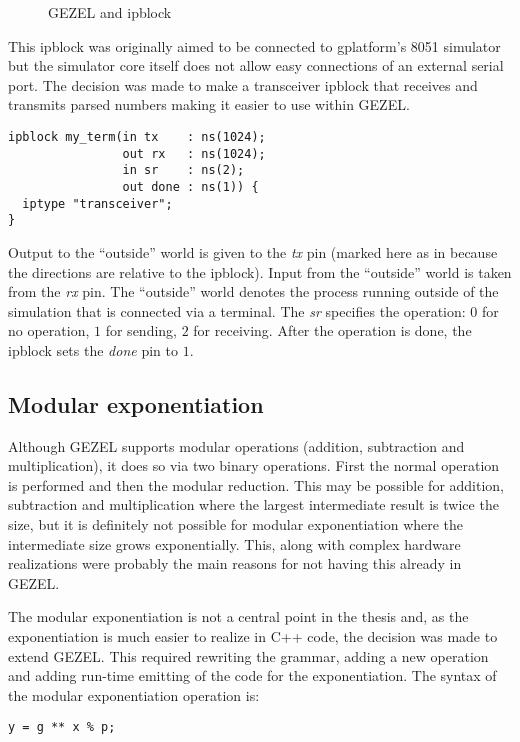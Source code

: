 \begin{figure}[hb!]
  \centering
  \caption{GEZEL and ipblock}
  \label{fig:gezel_ipblock}
\end{figure}

This ipblock was originally aimed to be connected to gplatform's 8051
simulator but the simulator core itself does not allow easy
connections of an external serial port. The decision was made to make
a transceiver ipblock that receives and transmits parsed numbers
making it easier to use within GEZEL.

\begin{lstlisting}[language=GEZEL]
ipblock my_term(in tx    : ns(1024);
                out rx   : ns(1024);
                in sr    : ns(2);
                out done : ns(1)) {
  iptype "transceiver";
}
\end{lstlisting}

Output to the ``outside'' world is given to the \emph{tx} pin (marked
here as in because the directions are relative to the ipblock). Input
from the ``outside'' world is taken from the \emph{rx} pin. The
``outside'' world denotes the process running outside of the
simulation that is connected via a terminal. The \emph{sr} specifies
the operation: $0$ for no operation, $1$ for sending, $2$ for
receiving. After the operation is done, the ipblock sets the
\emph{done} pin to $1$.

\subsection{Modular exponentiation}

Although GEZEL supports modular operations (addition, subtraction and
multiplication), it does so via two binary operations. First the normal
operation is performed and then the modular reduction. This may be
possible for addition, subtraction and multiplication where the
largest intermediate result is twice the size, but it is definitely
not possible for modular exponentiation where the intermediate size
grows exponentially. This, along with complex hardware realizations
were probably the main reasons for not having this already in GEZEL.

The modular exponentiation is not a central point in the thesis and,
as the exponentiation is much easier to realize in C++ code, the
decision was made to extend GEZEL. This required rewriting the
grammar, adding a new operation and adding run-time emitting of the
code for the exponentiation. The syntax of the modular exponentiation
operation is:
\begin{lstlisting}
y = g ** x % p;
\end{lstlisting}

